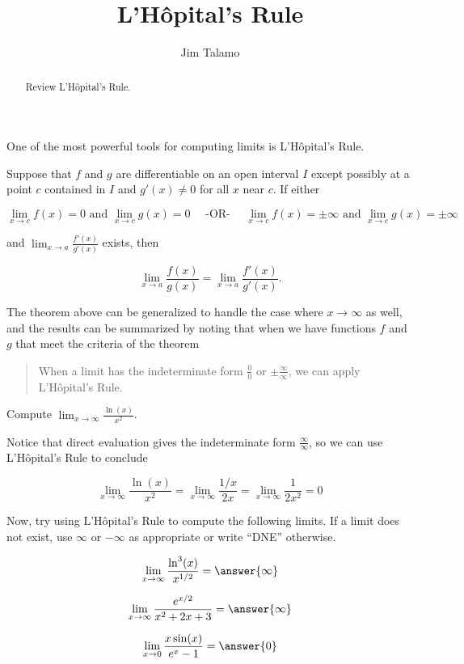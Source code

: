 \documentclass{ximera}
\author{Jim Talamo}
\title[Refresh:]{ L'H\^{o}pital's Rule}
\begin{document}
\begin{abstract}
Review  L'H\^{o}pital's Rule.
\end{abstract}
\maketitle

\begin{problem}
One of the most powerful tools for computing limits is L'H\^{o}pital's Rule.

\begin{theorem}
Suppose that $f$ and $g$ are differentiable on an open interval $I$ except possibly at a point $c$ contained in $I$ and $g'(x) \neq 0$
for all $x$ near $c$.  If either

\[ \lim _{x\to c}f(x)=0 \textrm{ and } \lim _{x\to c}g(x)=0 \quad  \textrm{ -OR- }  \quad \lim _{x\to c}f(x)= \pm \infty \textrm{ and } \lim _{x\to c}g(x)=\pm \infty\]

and $\lim_{x \to a} \frac{f'(x)}{g'(x)}$ exists, then

\[
\lim_{x \to a} \frac{f(x)}{g(x)} = \lim_{x \to a} \frac{f'(x)}{g'(x)}.
\]
\end{theorem}

The theorem above can be generalized to handle the case where $x \to \infty$ as well, and the results can be summarized by noting that when we have functions $f$ and $g$ that meet the criteria of the theorem

\begin{quote}
When a limit has the indeterminate form $\frac{0}{0}$ or $\pm \frac{\infty}{\infty}$, we can apply L'H\^{o}pital's Rule.
\end{quote}

\begin{example}
Compute $\lim_{x \to \infty} \frac{\ln(x)}{x^2}$.

\begin{explanation}
Notice that direct evaluation gives the indeterminate form $\frac{\infty}{\infty}$, so we can use L'H\^{o}pital's Rule to conclude

\[
\lim_{x \to \infty} \frac{\ln(x)}{x^2} = \lim_{x \to \infty} \frac{1/x}{2x} = \lim_{x \to \infty} \frac{1}{2x^2} =0
\]
\end{explanation}
\end{example}

Now, try using L'H\^{o}pital's Rule to compute the following limits.  If a limit does not exist, use $\infty$ or $-\infty$ as appropriate or write ``DNE'' otherwise.

\begin{exercise}
\[
\lim_{x \to \infty} \frac{\ln^3(x)}{x^{1/2}} = \answer{\infty}  
\]
\end{exercise}

\begin{exercise}
\[
\lim_{x \to \infty} \frac{e^{x/2}}{x^2+2x+3} = \answer{\infty}  
\]
\end{exercise}

\begin{exercise}
\[
\lim_{x \to 0} \frac{x \sin(x)}{e^x-1} = \answer{0}  
\]
\end{exercise}

\end{problem}
\end{document}
